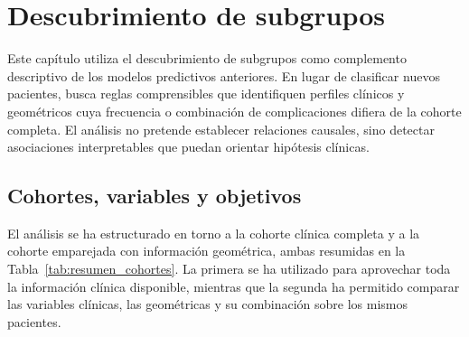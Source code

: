 \chapter{Descubrimiento de subgrupos}\label{chap:subgroup_discovery}


Este capítulo utiliza el descubrimiento de subgrupos como complemento descriptivo de los modelos predictivos anteriores. En lugar de clasificar nuevos pacientes, busca reglas comprensibles que identifiquen perfiles clínicos y geométricos cuya frecuencia o combinación de complicaciones difiera de la cohorte completa. El análisis no pretende establecer relaciones causales, sino detectar asociaciones interpretables que puedan orientar hipótesis clínicas.


\section{Cohortes, variables y objetivos}

El análisis se ha estructurado en torno a la cohorte clínica completa y a la cohorte emparejada con información geométrica, ambas resumidas en la Tabla~\ref{tab:resumen_cohortes}. La primera se ha utilizado para aprovechar toda la información clínica disponible, mientras que la segunda ha permitido comparar las variables clínicas, las geométricas y su combinación sobre los mismos pacientes.

